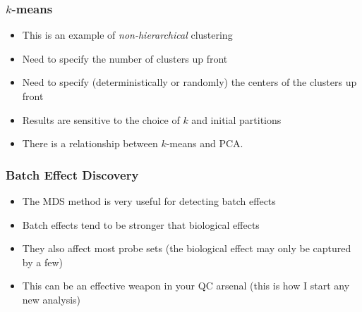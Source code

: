\documentclass[xcolor=x11names,compress]{beamer}\usepackage[]{graphicx}\usepackage[]{color}
\begin{document}
\begin{frame}
  \frametitle{$k$-means}
  \begin{itemize}
\item This is an example of {\it non-hierarchical} clustering
\item Need to specify the number of clusters up front
\item Need to specify (deterministically or randomly) the 
      centers of the clusters up front
\item Results are sensitive to the choice of $k$ and initial partitions
\item There is a relationship between $k$-means and PCA.
\end{itemize}
\end{frame}



\begin{frame}
  \frametitle{Batch Effect Discovery}
  \begin{itemize}
\item The MDS method is very useful for detecting batch effects
\item Batch effects tend to be stronger that biological effects
\item They also affect most probe sets (the biological effect may only be captured by a few)
\item This can be an effective weapon in your QC arsenal (this is how I start any new analysis)
\end{itemize}
\end{frame}
\end{document}
